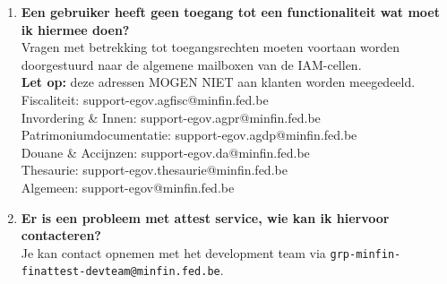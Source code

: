 \begin{enumerate}
    \item \textbf{Een gebruiker heeft geen toegang tot een functionaliteit wat moet ik hiermee doen?} \\
    Vragen met betrekking tot toegangsrechten moeten voortaan worden doorgestuurd naar de algemene mailboxen van de IAM-cellen.\\
    \textbf{Let op:} deze adressen MOGEN NIET aan klanten worden meegedeeld.\\
    Fiscaliteit: support-egov.agfisc@minfin.fed.be\\
    Invordering \& Innen: support-egov.agpr@minfin.fed.be\\
    Patrimoniumdocumentatie: support-egov.agdp@minfin.fed.be\\
    Douane \& Accijnzen: support-egov.da@minfin.fed.be\\
    Thesaurie: support-egov.thesaurie@minfin.fed.be\\
    Algemeen: support-egov@minfin.fed.be
    
    \item \textbf{Er is een probleem met attest service, wie kan ik hiervoor contacteren?} \\
    Je kan contact opnemen met het development team via \texttt{grp-minfin-finattest-devteam@minfin.fed.be}.
    

\end{enumerate}
